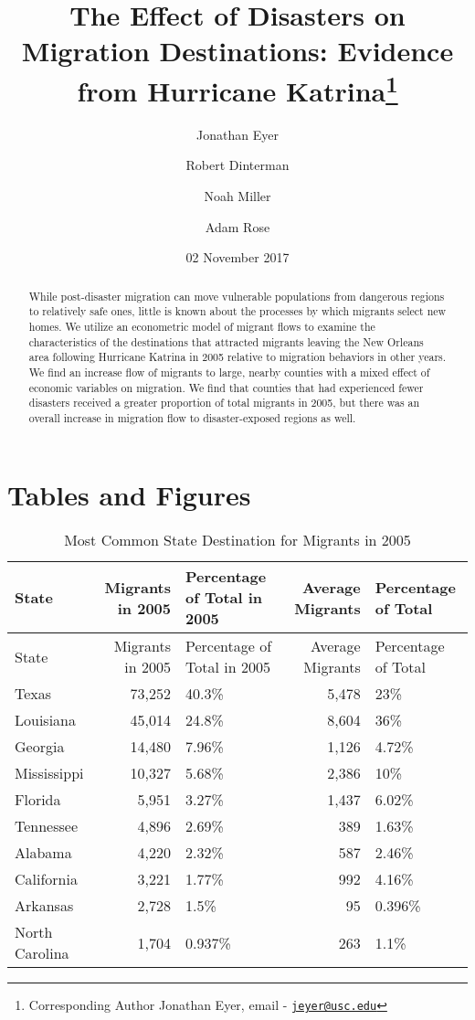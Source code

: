 \documentclass[]{article}
\title{The Effect of Disasters on Migration Destinations: Evidence from
Hurricane Katrina\thanks{Corresponding Author Jonathan Eyer, email -
\href{mailto:jeyer@usc.edu}{\nolinkurl{jeyer@usc.edu}}}}
\author[1]{Jonathan Eyer}
\author[2]{Robert Dinterman}
\author[1]{Noah Miller}
\author[1]{Adam Rose}
\affil[1]{University of Southern California}
\affil[2]{The Ohio State University}
\date{02 November 2017}
\begin{document}
\maketitle

\begin{abstract}
\noindent While post-disaster migration can move vulnerable populations from
dangerous regions to relatively safe ones, little is known about the
processes by which migrants select new homes. We utilize an econometric
model of migrant flows to examine the characteristics of the
destinations that attracted migrants leaving the New Orleans area
following Hurricane Katrina in 2005 relative to migration behaviors in
other years. We find an increase flow of migrants to large, nearby
counties with a mixed effect of economic variables on migration. We find
that counties that had experienced fewer disasters received a greater
proportion of total migrants in 2005, but there was an overall increase
in migration flow to disaster-exposed regions as well.
\vspace{.5cm}

\end{abstract}
\newpage

\section{Tables and Figures}\label{tables-and-figures}

\begin{longtable}[]{@{}lrlrl@{}}
\caption{Most Common State Destination for Migrants in 2005
\label{tab:commondeststate}}\tabularnewline
\toprule
State & Migrants in 2005 & Percentage of Total in 2005 & Average
Migrants & Percentage of Total\tabularnewline
\midrule
\endfirsthead
\toprule
State & Migrants in 2005 & Percentage of Total in 2005 & Average
Migrants & Percentage of Total\tabularnewline
\midrule
\endhead
Texas & 73,252 & 40.3\% & 5,478 & 23\%\tabularnewline
Louisiana & 45,014 & 24.8\% & 8,604 & 36\%\tabularnewline
Georgia & 14,480 & 7.96\% & 1,126 & 4.72\%\tabularnewline
Mississippi & 10,327 & 5.68\% & 2,386 & 10\%\tabularnewline
Florida & 5,951 & 3.27\% & 1,437 & 6.02\%\tabularnewline
Tennessee & 4,896 & 2.69\% & 389 & 1.63\%\tabularnewline
Alabama & 4,220 & 2.32\% & 587 & 2.46\%\tabularnewline
California & 3,221 & 1.77\% & 992 & 4.16\%\tabularnewline
Arkansas & 2,728 & 1.5\% & 95 & 0.396\%\tabularnewline
North Carolina & 1,704 & 0.937\% & 263 & 1.1\%\tabularnewline
\bottomrule
\end{longtable}
\end{document}
